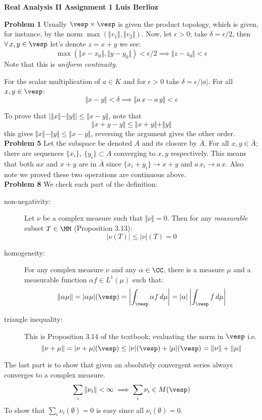 \noindent\textbf{Real Analysis II Assignment 1 \hspace{\fill} Luis Berlioz}

 \noindent \textbf{Problem 1} Usually $\vesp\times \vesp$ is given the product topology, which is given, for instance, by the norm $\max(\Vert v_1\Vert,\Vert v_2\Vert)$. Now, let $\epsilon>0$; take $\delta=\epsilon/2$, then $\forall \, x,y\in \vesp$ let's denote $z=x+y$ we see:
    $$    \max(\Vert x-x_0\Vert,\Vert y-y_0\Vert) < \epsilon/2 \implies \Vert z-z_0\Vert< \epsilon $$
    Note that this is \emph{uniform continuity}.

    For the scalar multiplication of $a\in K$ and for $\epsilon>0$ take $\delta=\epsilon/|a|$. For all $x, y \in \vesp$:
    $$\Vert x -  y\Vert < \delta \implies \Vert a\, x - a\, y \Vert < \epsilon$$ 

    To prove that $|\Vert x \Vert - \Vert y \Vert | \leq \Vert x-y\Vert$, note that 
    $$\Vert x + y -y \Vert \leq \Vert x+ y\Vert + \Vert y \Vert$$
    this gives $\Vert x\Vert - \Vert y \Vert \leq \Vert x-y\Vert$, reversing the argument gives the other order.\\[1em]


    \noindent\textbf{Problem 5} Let the subspace be denoted $A$ and its closure by $\bar A$. For all $x,y \in \bar A$; there are  sequences $\{x_i\},\ \{y_i\}\subset A$ converging to $x,y$ respectively. This means that both $ax$ and $x+y$ are in $ \bar A$ since $\{x_i+ y_i\}\to x+y$ and $a\, x_i \to a\, x$. Also note we proved these two operations are continuous above.\\[1em]
    \noindent\textbf{Problem 8} We check each part of the definition:
    \begin{description}
        \item[non-negativity:] Let $\nu$ be a complex measure such that $\Vert \nu \Vert=0$. Then for any \emph{measurable} subset  $T\in \MM$ (Proposition 3.13):
            $$| \nu(T) | \leq |\nu|(T)=0$$
            
        \item[homogeneity:] For any complex measure $\nu$ and any $\alpha\in\CC$, there is a measure $\mu$ and a measurable function $\alpha f\in L^1(\mu)$ such that:
            $$\Vert \alpha \mu \Vert = |\alpha\mu|(\vesp) = \left|\int_\vesp \alpha f\, d\mu\right|=|\alpha|\left|\int_\vesp  f\, d\mu\right|$$
        \item[triangle inequality:] This is Proposition 3.14 of the textbook; evaluating the norm in $\vesp$ i.e.
            $$\Vert \nu+\mu \Vert = |\nu +\mu|(\vesp)\leq |\nu|(\vesp) +|\mu|(\vesp) = \Vert \nu\Vert +\Vert \mu\Vert$$
    \end{description}
    The last part is to show that given an absolutely convergent series always converges to a complex measure.
    $$\sum_i\Vert \nu_i\Vert <\infty \implies \sum_i \nu_i \in M(\vesp)$$
    To show that $\sum_i \nu_i(\emptyset)=0$ is easy since all $\nu_i(\emptyset)=0$.

